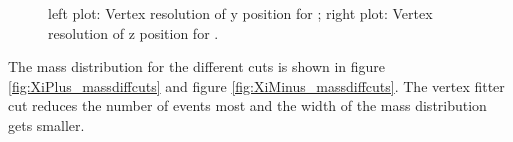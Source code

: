		\begin{figure}
			\caption{\propose left plot: Vertex resolution of y position for \anticascade; right plot: Vertex resolution of z position for \anticascade.}
			\label{fig:xi_vtxres_yz}
			
		\end{figure}
	
		The mass distribution for the different cuts is shown in figure \ref{fig:XiPlus_massdiffcuts} and figure \ref{fig:XiMinus_massdiffcuts}. 
		The vertex fitter cut reduces the number of events most and the width of the mass distribution gets smaller.
		
